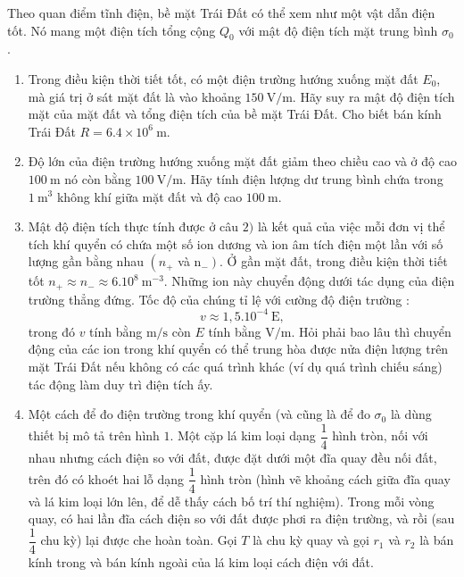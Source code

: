 \begin{vd}
Theo quan điểm tĩnh điện, bề mặt Trái Đất có thể xem như một vật dẫn điện tốt. Nó mang một điện tích tổng cộng $Q_{0}$ với mật độ điện tích mặt trung bình $\sigma_0$.
\begin{enumerate}[1)]
    \item Trong điều kiện thời tiết tốt, có một điện trường hướng xuống mặt đất ${E}_{{0}}$, mà giá trị ở sát mặt đất là vào khoảng $150 ~{\mathrm{V}/\mathrm{m}}$. Hãy suy ra mật độ điện tích mặt của mặt đất và tổng điện tích của bề mặt Trái Đất. Cho biết bán kính Trái Đất $R = 6.4 \times 10^6 ~\mathrm{m}.$
    \item Độ lớn của điện trường hướng xuống mặt đất giảm theo chiều cao và ở độ cao $100 \mathrm{~m}$ nó còn bằng $100 ~{\mathrm{V}}/{\mathrm{m}}$. Hãy tính điện lượng dư trung bình chứa trong $1 \mathrm{~m}^{3}$ không khí giữa mặt đất và độ cao $100 \mathrm{~m}$.
    \item Mật độ điện tích thực tính được ở câu $2)$ là kết quả của việc mỗi đơn vị thể tích khí quyển có chứa một số ion dương và ion âm tích điện một lần với số lượng gần bằng nhau $\left(n_{+}\right.$ và $\left. \mathrm{n}_{-}\right)$. Ở gần mặt đất, trong điều kiện thời tiết tốt $n_{+} \approx n_{-} \approx 6.10^{8} \mathrm{~m}^{-3}$. Những ion này chuyển động dưới tác dụng của điện trường thẳng đứng. Tốc độ của chúng tỉ lệ với cường độ điện trường :
    \[v \approx 1,5.10^{-4} ~\mathrm{E},\]
    trong đó $v$ tính bằng $\mathrm{m/s}$ còn $E$ tính bằng $\mathrm{V/m}$. Hỏi phải bao lâu thì chuyển động của các ion trong khí quyển có thể trung hòa được nửa điện lượng trên mặt Trái Đất nếu không có các quá trình khác (ví dụ quá trình chiếu sáng) tác động làm duy trì điện tích ấy.
    \item Một cách để đo điện trường trong khí quyển (và cũng là để đo $\sigma_{0}$ là dùng thiết bị mô tả trên hình $1$. Một cặp lá kim loại dạng $\dfrac{1}{4}$ hình tròn, nối với nhau nhưng cách điện so với đất, được đặt dưới một đĩa quay đều nối đất, trên đó có khoét hai lỗ dạng $\dfrac{1}{4}$ hình tròn (hình vẽ khoảng cách giữa đĩa quay và lá kim loại lớn lên, để dễ thấy cách bố trí thí nghiệm). Trong mỗi vòng quay, có hai lần đĩa cách điện so với đất được phơi ra điện trường, và rồi (sau $\dfrac{1}{4}$ chu kỳ) lại được che hoàn toàn. Gọi $T$ là chu kỳ quay và gọi $r_{1}$ và $r_{2}$ là bán kính trong và bán kính ngoài của lá kim loại cách điện với đất.
    \begin{center}


\end{center}
\end{enumerate}
\end{vd}
